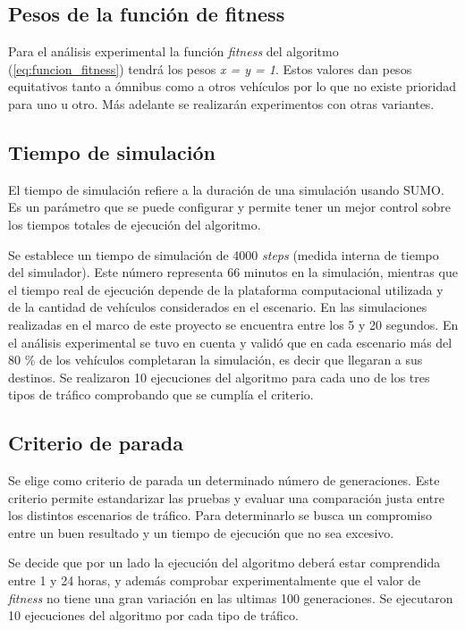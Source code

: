 \subsection{Pesos de la función de fitness}

Para el análisis experimental la función \emph{fitness} del algoritmo (\ref{eq:funcion_fitness}) tendrá los pesos \emph{x = y = 1}. Estos valores dan pesos equitativos tanto a ómnibus como a otros vehículos por lo que no existe prioridad para uno u otro. Más adelante se realizarán experimentos con otras variantes.


\subsection{Tiempo de simulación}
El tiempo de simulación refiere a la duración de una simulación usando SUMO. Es un parámetro que se puede configurar y permite tener un mejor control sobre los tiempos totales de ejecución del algoritmo.

Se establece un tiempo de simulación de 4000 \emph{steps} (medida interna de tiempo del simulador). Este número representa 66 minutos en la simulación, mientras que el tiempo real de ejecución depende de la plataforma computacional utilizada y de la cantidad de vehículos considerados en el escenario. En las simulaciones realizadas en el marco de este proyecto se encuentra entre los 5 y 20 segundos. En el análisis experimental se tuvo en cuenta y validó que en cada escenario más del 80 \% de los vehículos completaran la simulación, es decir que llegaran a sus destinos. Se realizaron 10 ejecuciones del algoritmo para cada uno de los tres tipos de tráfico comprobando que se cumplía el criterio.


\subsection{Criterio de parada}
Se elige como criterio de parada un determinado número de generaciones. Este criterio permite estandarizar las pruebas y evaluar una comparación justa entre los distintos escenarios de tráfico. Para determinarlo se busca un compromiso entre un buen resultado y un tiempo de ejecución que no sea excesivo.

Se decide que por un lado la ejecución del algoritmo deberá estar comprendida entre 1 y 24 horas, y además comprobar experimentalmente que el valor de \emph{fitness} no tiene una gran variación en las ultimas 100 generaciones. Se ejecutaron 10 ejecuciones del algoritmo por cada tipo de tráfico.

